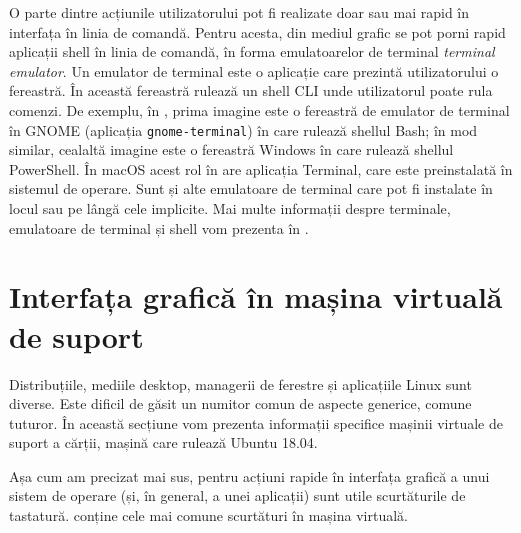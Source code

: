 O parte dintre acțiunile utilizatorului pot fi realizate doar sau mai rapid în interfața în linia de comandă. Pentru acesta, din mediul grafic se pot porni rapid aplicații shell în linia de comandă, în forma emulatoarelor de terminal \textit{terminal emulator}. Un emulator de terminal este o aplicație care prezintă utilizatorului o fereastră. În această fereastră rulează un shell CLI unde utilizatorul poate rula comenzi. De exemplu, în , prima imagine este o fereastră de emulator de terminal în GNOME (aplicația \texttt{gnome-terminal}) în care rulează shellul Bash; în mod similar, cealaltă imagine este o fereastră Windows în care rulează shellul PowerShell. În macOS acest rol în are aplicația Terminal, care este preinstalată în sistemul de operare. Sunt și alte emulatoare de terminal care pot fi instalate în locul sau pe lângă cele implicite. Mai multe informații despre terminale, emulatoare de terminal și shell vom prezenta în .

\section{Interfața grafică în mașina virtuală de suport}
\label{sec:ui:vm}

Distribuțiile, mediile desktop, managerii de ferestre și aplicațiile Linux sunt diverse. Este dificil de găsit un numitor comun de aspecte generice, comune tuturor. În această secțiune vom prezenta informații specifice mașinii virtuale de suport a cărții, mașină care rulează Ubuntu 18.04.

Așa cum am precizat mai sus, pentru acțiuni rapide în interfața grafică a unui sistem de operare (și, în general, a unei aplicații) sunt utile scurtăturile de tastatură.  conține cele mai comune scurtături în mașina virtuală.

